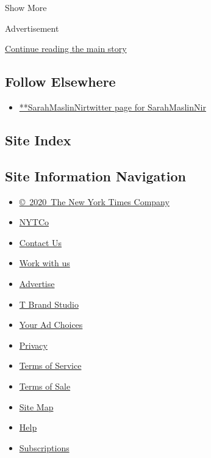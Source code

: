 Show More

Advertisement

\protect\hyperlink{after-mid2}{Continue reading the main story}

\hypertarget{follow-elsewhere}{%
\subsection{Follow Elsewhere}\label{follow-elsewhere}}

\begin{itemize}
\tightlist
\item
  \href{https://twitter.com/SarahMaslinNir}{**SarahMaslinNirtwitter page
  for SarahMaslinNir}
\end{itemize}

\hypertarget{site-index}{%
\subsection{Site Index}\label{site-index}}

\hypertarget{site-information-navigation}{%
\subsection{Site Information
Navigation}\label{site-information-navigation}}

\begin{itemize}
\tightlist
\item
  \href{https://help.nytimes3xbfgragh.onion/hc/en-us/articles/115014792127-Copyright-notice}{©~2020~The
  New York Times Company}
\end{itemize}

\begin{itemize}
\tightlist
\item
  \href{https://www.nytco.com/}{NYTCo}
\item
  \href{https://help.nytimes3xbfgragh.onion/hc/en-us/articles/115015385887-Contact-Us}{Contact
  Us}
\item
  \href{https://www.nytco.com/careers/}{Work with us}
\item
  \href{https://nytmediakit.com/}{Advertise}
\item
  \href{http://www.tbrandstudio.com/}{T Brand Studio}
\item
  \href{https://www.nytimes3xbfgragh.onion/privacy/cookie-policy\#how-do-i-manage-trackers}{Your
  Ad Choices}
\item
  \href{https://www.nytimes3xbfgragh.onion/privacy}{Privacy}
\item
  \href{https://help.nytimes3xbfgragh.onion/hc/en-us/articles/115014893428-Terms-of-service}{Terms
  of Service}
\item
  \href{https://help.nytimes3xbfgragh.onion/hc/en-us/articles/115014893968-Terms-of-sale}{Terms
  of Sale}
\item
  \href{https://spiderbites.nytimes3xbfgragh.onion}{Site Map}
\item
  \href{https://help.nytimes3xbfgragh.onion/hc/en-us}{Help}
\item
  \href{https://www.nytimes3xbfgragh.onion/subscription?campaignId=37WXW}{Subscriptions}
\end{itemize}
